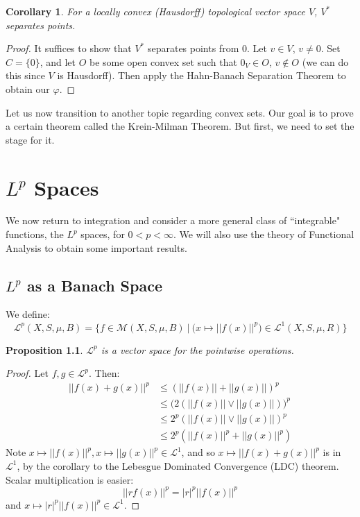 \documentclass[a4paper,12pt]{report}
\newcommand{\ms}[1]{\mathscr{#1}}
\newcommand{\vphi} {\varphi}
\newtheorem{corollary}[theorem]{Corollary}
\newtheorem{prop}[theorem]{Proposition}
\newenvironment{definition}[1][Definition.]{\begin{trivlist}
\item[\hskip \labelsep {\bfseries #1}]}{\end{trivlist}}
\begin{document}
	\begin{corollary}
	For a locally convex (Hausdorff) topological vector space $V$, $V^*$ separates points.
	\end{corollary}
	\begin{proof}
	It suffices to show that $V^*$ separates points from $0$. Let $v \in V$, $v \neq 0$. Set $C = \{0\}$, and let $O$ be some open convex set such that $0_V \in O$, $v \notin O$ (we can do this since $V$ is Hausdorff). Then apply the Hahn-Banach Separation Theorem to obtain our $\vphi$.
	\end{proof}
		
	\noindent Let us now transition to another topic regarding convex sets. Our goal is to prove a certain theorem called the Krein-Milman Theorem. But first, we need to set the stage for it.
		
	
	\newpage
	\chapter{$L^p$ Spaces}
	We now return to integration and consider a more general class of ``integrable" functions, the $L^p$ spaces, for $0 < p < \infty$. We will also use the theory of Functional Analysis to obtain some important results. 
	
	\section{$L^p$ as a Banach Space}
	
	\begin{definition}
	We define:
	\[ \ms{L}^p(X, S, \mu, B) = \bigg\{ f \in \ms{M}(X, S, \mu, B) ~\bigg|~ \big(x \mapsto ||f(x)||^p \big) \in \ms{L}^1(X, S, \mu, R) \bigg\} \]
	\end{definition}
	
	\begin{prop}
	$\ms{L}^p$ is a vector space for the pointwise operations. 
	\end{prop}
	\begin{proof}
	Let $f, g \in \ms{L}^p$. Then:
	\begin{align*} 
	||f(x) + g(x)||^p &\leq (||f(x)|| + ||g(x)||)^p \\
	&\leq \big( 2 (||f(x)|| \vee ||g(x)||)\big)^p \\
	&\leq 2^p (||f(x)|| \vee ||g(x)||)^p \\
	&\leq 2^p (||f(x)||^p + ||g(x)||^p)
	\end{align*}
	Note $x \mapsto ||f(x)||^p, x \mapsto ||g(x)||^p \in \ms{L}^1$, and so $x \mapsto ||f(x) + g(x)||^p$ is in $\ms{L}^1$, by the corollary to the Lebesgue Dominated Convergence (LDC) theorem. Scalar multiplication is easier:
	\[ ||rf(x)||^p = |r|^p||f(x)||^p \]
	and $x \mapsto |r|^p ||f(x)||^p \in \ms{L}^1$. 
	\end{proof}
	
\end{document}

